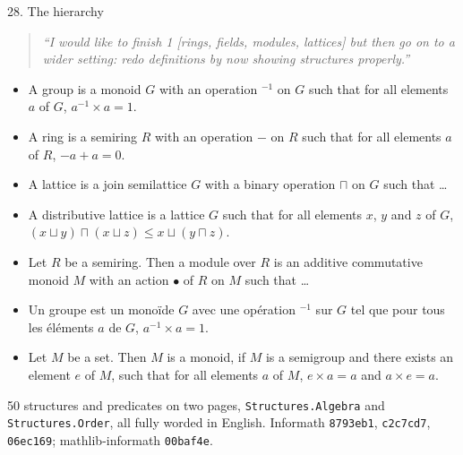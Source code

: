 \documentclass[10pt,aspectratio=169]{beamer}
\newcommand{\ok}[1]{\textcolor{good}{#1}}
\newcommand{\commit}[1]{\texttt{\footnotesize #1}}
\newcommand{\prompt}[1]{\begin{quote}\small\itshape ``#1''\end{quote}}
\begin{document}
\begin{frame}{28. The hierarchy}
  \footnotesize
  \prompt{I would like to finish 1 [rings, fields, modules, lattices] but then go on to a wider
  setting: redo definitions by now showing structures properly.}
  \begin{itemize}
    \item A group is a monoid $G$ with an operation ${}^{-1}$ on $G$ such that for all
          elements $a$ of $G$, $a^{-1} \times a = 1$.
    \item A ring is a semiring $R$ with an operation $-$ on $R$ such that for all elements
          $a$ of $R$, $-a + a = 0$.
    \item A lattice is a join semilattice $G$ with a binary operation $\sqcap$ on $G$ such that
          \ldots
    \item A distributive lattice is a lattice $G$ such that for all elements $x$, $y$ and $z$
          of $G$, $(x \sqcup y) \sqcap (x \sqcup z) \leq x \sqcup (y \sqcap z)$.
    \item \ok{Let $R$ be a semiring. Then} a module over $R$ is an additive commutative monoid
          $M$ with an action $\bullet$ of $R$ on $M$ such that \ldots
    \item Un groupe est un monoïde $G$ avec une opération ${}^{-1}$ sur $G$ tel que pour tous
          les éléments $a$ de $G$, $a^{-1} \times a = 1$.
    \item Let $M$ be a set. Then $M$ is a monoid, if $M$ is a semigroup and there exists an
          element $e$ of $M$, such that for all elements $a$ of $M$, $e \times a = a$ and
          $a \times e = a$.
  \end{itemize}
  50 structures and predicates on two pages, \texttt{Structures.Algebra} and
  \texttt{Structures.Order}, all fully worded in English. Informath \commit{8793eb1},
  \commit{c2c7cd7}, \commit{06ec169}; mathlib-informath \commit{00baf4e}.
\end{frame}
\end{document}
